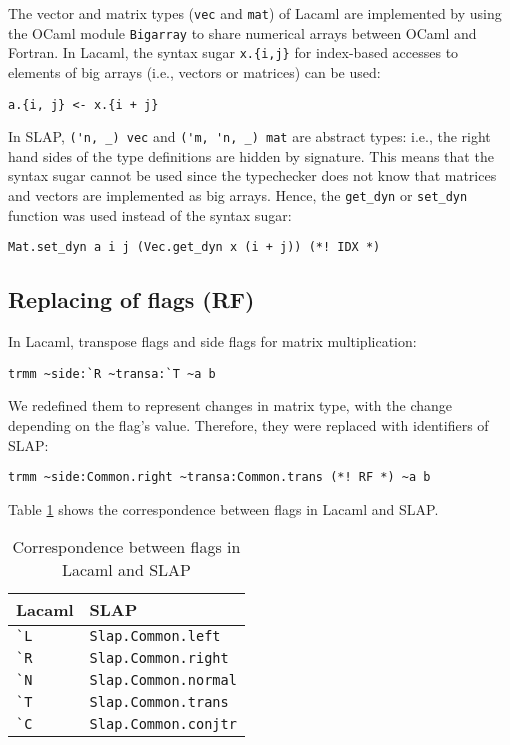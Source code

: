 \documentclass[10pt,a4paper]{article}
\begin{document}
The vector and matrix types (\lstinline|vec| and \lstinline|mat|)
of Lacaml are implemented by using the OCaml module \lstinline|Bigarray|
to share numerical arrays between OCaml and Fortran.
In Lacaml, the syntax sugar \lstinline|x.{i,j}| for index-based
accesses to elements of big arrays (i.e., vectors or matrices) can be used:
\begin{lstlisting}
a.{i, j} <- x.{i + j}
\end{lstlisting}
In SLAP, \lstinline|('n, _) vec| and \lstinline|('m, 'n, _) mat| are abstract
types: i.e., the right hand sides of the type definitions are hidden
by signature. This means that the syntax sugar cannot be used
since the typechecker does not know that matrices and vectors are implemented
as big arrays.
Hence, the \lstinline|get_dyn| or \lstinline|set_dyn|
function was used instead of the syntax sugar:
\begin{lstlisting}
Mat.set_dyn a i j (Vec.get_dyn x (i + j)) (*! IDX *)
\end{lstlisting}

\subsection{Replacing of flags (RF)}
\label{sec:RF}

In Lacaml, transpose flags and side flags for matrix multiplication:
\begin{lstlisting}
trmm ~side:`R ~transa:`T ~a b
\end{lstlisting}
We redefined them to represent changes in matrix type, with the change depending
on the flag's value. Therefore, they were replaced with identifiers of SLAP:
\begin{lstlisting}
trmm ~side:Common.right ~transa:Common.trans (*! RF *) ~a b
\end{lstlisting}
Table \ref{tbl:flags} shows the correspondence between flags in Lacaml and SLAP.
\begin{table}[tbp]
  \centering
  \begin{tabular}{ll}
    \hline
    Lacaml & SLAP \\
    \hline
    \lstinline|`L| & \lstinline|Slap.Common.left| \\
    \lstinline|`R| & \lstinline|Slap.Common.right| \\
    \hline
    \lstinline|`N| & \lstinline|Slap.Common.normal| \\
    \lstinline|`T| & \lstinline|Slap.Common.trans| \\
    \lstinline|`C| & \lstinline|Slap.Common.conjtr| \\
    \hline
  \end{tabular}
  \caption{Correspondence between flags in Lacaml and SLAP}
  \label{tbl:flags}
\end{table}
\end{document}
